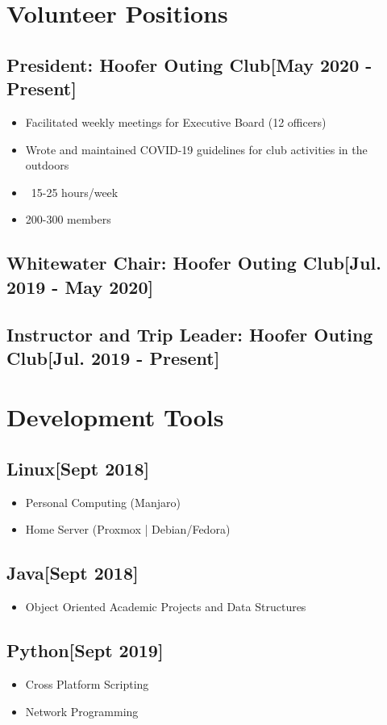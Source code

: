\documentclass{article}
\begin{document}
\section{Volunteer Positions}

    \subsection{\textbf{President}: Hoofer Outing Club\hfill[May 2020 - Present]}
        \begin{itemize}
            \item Facilitated weekly meetings for Executive Board (12 officers)
            \item Wrote and maintained COVID-19 guidelines for club activities in the outdoors
            \item ~15-25 hours/week
            \item 200-300 members
        \end{itemize}

    \subsection{\textbf{Whitewater Chair}: Hoofer Outing Club\hfill[Jul. 2019 - May 2020]}

    \subsection{\textbf{Instructor and Trip Leader}: Hoofer Outing Club\hfill[Jul. 2019 - Present]}

\section{Development Tools}

    \subsection{\textbf{Linux}\hfill[Sept 2018]}
        \begin{itemize}
            \item Personal Computing (Manjaro)
            \item Home Server (Proxmox | Debian/Fedora)
        \end{itemize}

    \subsection{\textbf{Java}\hfill{[Sept 2018]}}
        \begin{itemize}
            \item Object Oriented Academic Projects and Data Structures
        \end{itemize}

    \subsection{\textbf{Python}\hfill{[Sept 2019]}}
        \begin{itemize}
            \item Cross Platform Scripting
            \item Network Programming
        \end{itemize}
\end{document}
